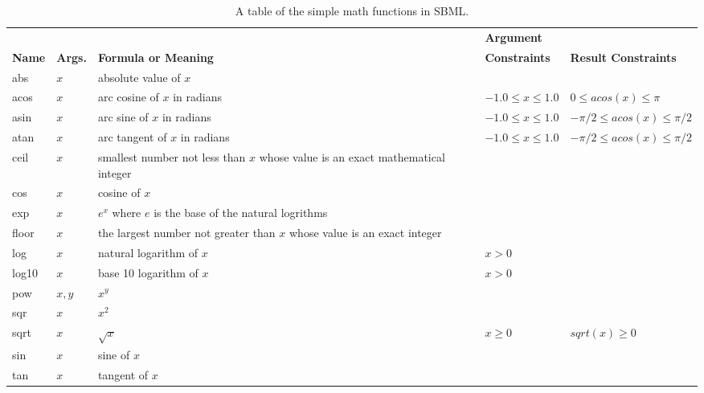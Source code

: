 \documentclass[10pt]{cek-article}
\begin{document}
\begin{table}[ht]
\begin{tabular}{p{1cm}p{0.8cm}p{6cm}p{2.6cm}p{4cm}}
\hline
  & & & \textbf{Argument} \\
\textbf{Name} & \textbf{Args.} & \textbf{Formula or Meaning} &
\textbf{Constraints} & \textbf{Result Constraints} \\
\hline
abs & $x$ & absolute value of $x$ & &
\\

acos & $x$ & arc cosine of $x$ in radians & $ -1.0 \leq x \leq 1.0
$ & $ 0 \leq acos(x) \leq \pi $  \\

asin & $x$ & arc sine of $x$ in radians & $ -1.0 \leq x \leq 1.0 $
& $ -\pi/2 \leq acos(x) \leq \pi/2 $
\\

atan & $x$ & arc tangent of $x$ in radians & $ -1.0 \leq x \leq
1.0 $ & $ -\pi/2 \leq acos(x) \leq \pi/2 $
\\

ceil & $x$ & smallest number not less than $x$ whose value is
an exact mathematical integer & & \\

cos & $x$ & cosine of $x$ & & \\

exp & $x$ & $e^x$ where $e$ is the base of the natural logrithms &
& \\

floor & $x$ & the largest number not greater than $x$ whose
value is an exact integer & & \\

log & $x$ & natural logarithm of $x$ & $x > 0$ & \\

log10 & $x$ & base 10 logarithm of $x$ & $x > 0$ & \\


pow & $x, y$ & $x^y$ & & \\

sqr & $x$ & $ x^2 $ & & \\

sqrt & $x$ & $ \sqrt{x} $ & $ x \geq 0 $ & $ sqrt(x) \geq 0 $ \\


sin & $x$ & sine of  $x$ & & \\

tan & $x$ & tangent of $x$ & &
\end{tabular}
\caption{A table of the simple math functions in SBML.}

\label{tab:simplemath}
\end{table}
\end{document}
